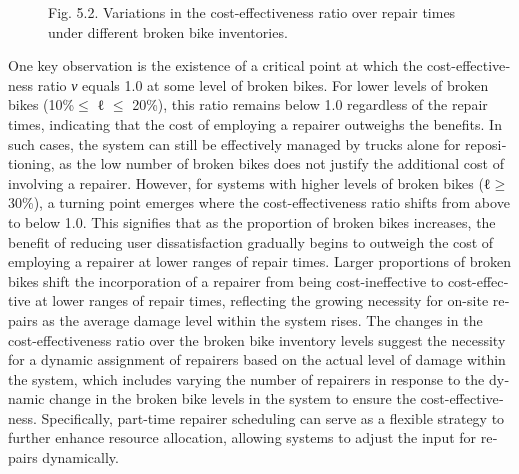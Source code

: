 \documentclass[
  english,
]{article}
\begin{document}
\begin{otherlanguage}{english}
\begin{figure}
\centering
Fig. 5.2. Variations in the cost-effectiveness ratio over repair times under different broken bike
inventories.
\caption{}\label{f0040}
\end{figure}

\protect{}\label{p0680}
One key observation is the existence of a critical point at which the cost-effectiveness ratio
\emph{ν} equals 1.0 at some level of broken bikes. For lower levels of broken bikes (10\%\ensuremath{\leq} ℓ \ensuremath{\leq}
20\%), this ratio remains below 1.0 regardless of the repair times, indicating that the cost of
employing a repairer outweighs the benefits. In such cases, the system can still be effectively
managed by trucks alone for repositioning, as the low number of broken bikes does not justify the
additional cost of involving a repairer. However, for systems with higher levels of broken bikes
(ℓ\ensuremath{\geq}30\%), a turning point emerges where the cost-effectiveness ratio shifts from above to below 1.0.
This signifies that as the proportion of broken bikes increases, the benefit of reducing user
dissatisfaction gradually begins to outweigh the cost of employing a repairer at lower ranges of
repair times. Larger proportions of broken bikes shift the incorporation of a repairer from being
cost-ineffective to cost-effective at lower ranges of repair times, reflecting the growing necessity
for on-site repairs as the average damage level within the system rises. The changes in the
cost-effectiveness ratio over the broken bike inventory levels suggest the necessity for a dynamic
assignment of repairers based on the actual level of damage within the system, which includes
varying the number of repairers in response to the dynamic change in the broken bike levels in the
system to ensure the cost-effectiveness. Specifically, part-time repairer scheduling can serve as a
flexible strategy to further enhance resource allocation, allowing systems to adjust the input for
repairs dynamically.


\end{otherlanguage}
\end{document}
